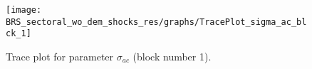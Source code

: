 \begin{figure}[H]
\centering
  \texttt{[image: BRS\_sectoral\_wo\_dem\_shocks\_res/graphs/TracePlot\_sigma\_ac\_blck\_1]}\\
    \caption{Trace plot for parameter ${\sigma_{ac}}$ (block number 1).}
\end{figure}
